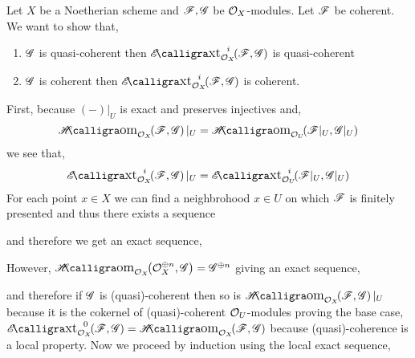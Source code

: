 \documentclass[12pt]{article}
\begin{document}
Let $X$ be a Noetherian scheme and $\mathscr{F}, \mathscr{G}$ be $\mathcal{O}_{X}$-modules. Let $\mathscr{F}$ be coherent. We want to show that,
\begin{enumerate}
\item $\mathscr{G}$ is quasi-coherent then $\shExt{i}{\struct{X}}{\F}{\G}$ is quasi-coherent
\item $\mathscr{G}$ is coherent then $\shExt{i}{\struct{X}}{\F}{\G}$ is coherent.
\end{enumerate}
\noindent
First, because $(-)|_U$ is exact and preserves injectives and,
\[ \shHom{\struct{X}}{\F}{\G}|_U = \shHom{\struct{U}}{\F|_U}{\G|_U} \]
we see that,
\[ \shExt{i}{\struct{X}}{\F}{\G}|_U = \shExt{i}{\struct{U}}{\F|_U}{\G|_U} \] 
For each point $x \in X$ we can find a neighbrohood $x \in U$ on which $\mathscr{F}$ is finitely presented and thus there exists a sequence
\begin{center}
\end{center}
and therefore we get an exact sequence,
\begin{center}
\end{center}
However, $\shHom{\struct{X}}{\struct{X}^{\oplus n}}{\G} = \G^{\oplus n}$ giving an exact sequence,
\begin{center}
\end{center}
and therefore if $\mathscr{G}$ is (quasi)-coherent then so is $\shHom{\struct{X}}{\F}{\G}|_U $ because it is the cokernel of (quasi)-coherent $\mathcal{O}_{U}$-modules proving the base case, $\shExt{0}{\struct{X}}{\F}{\G} = \shHom{\struct{X}}{\F}{\G}$ because (quasi)-coherence is a local property. Now we proceed by induction using the local exact sequence,
\begin{center}
\end{center}
\end{document}

